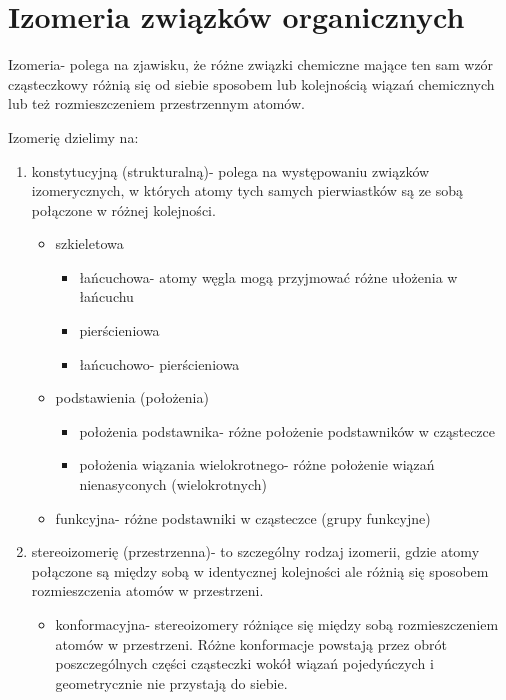 \section{Izomeria związków organicznych}

Izomeria- polega na zjawisku, że różne związki chemiczne mające ten sam wzór cząsteczkowy różnią się od siebie sposobem lub kolejnością wiązań chemicznych lub też rozmieszczeniem przestrzennym atomów.
\newline

Izomerię dzielimy na:
\begin{enumerate}
    \item konstytucyjną (strukturalną)- polega na występowaniu związków izomerycznych, w których atomy tych samych pierwiastków są ze sobą połączone w różnej kolejności.
    
    \begin{itemize}
        \item szkieletowa
        
        \begin{itemize}
            \item łańcuchowa- atomy węgla mogą przyjmować różne ułożenia w łańcuchu
            \item pierścieniowa
            \item łańcuchowo- pierścieniowa
        \end{itemize}
        \item podstawienia (położenia) 
        
        \begin{itemize}
            \item położenia podstawnika- różne położenie podstawników w cząsteczce
            \item położenia wiązania wielokrotnego- różne położenie wiązań nienasyconych (wielokrotnych)
        \end{itemize}
        \item funkcyjna- różne podstawniki w cząsteczce (grupy funkcyjne)
    \end{itemize}
    \item stereoizomerię (przestrzenna)- to szczególny rodzaj izomerii, gdzie atomy połączone są między sobą w identycznej kolejności ale różnią się sposobem rozmieszczenia atomów w przestrzeni.
    
    \begin{itemize}
        \item konformacyjna- stereoizomery różniące się między sobą rozmieszczeniem atomów w przestrzeni. Różne konformacje powstają przez obrót poszczególnych części cząsteczki wokół wiązań pojedyńczych i geometrycznie nie przystają do siebie.
        

\end{itemize}
\end{enumerate}
